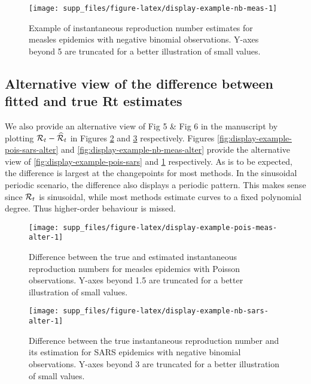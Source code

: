 \documentclass[
]{article}
\begin{document}
\begin{figure}[!ht]

{\centering \texttt{[image: supp\_files/figure-latex/display-example-nb-meas-1]} 

}

\caption{Example of instantaneous reproduction number estimates for measles epidemics with negative binomial observations. Y-axes beyond 5 are truncated for a better illustration of small values.}\label{fig:display-example-nb-meas}
\end{figure}

\clearpage

\subsection{Alternative view of the difference between fitted and true Rt estimates}\label{alternative-view-of-the-difference-between-fitted-and-true-rt-estimates}

We also provide an alternative view of Fig 5 \& Fig 6 in the manuscript by
plotting \(\mathcal{R}_t - \widehat{\mathcal{R}}_t\) in Figures
\ref{fig:display-example-pois-meas-alter} and
\ref{fig:display-example-nb-sars-alter} respectively.
Figures \ref{fig:display-example-pois-sars-alter} and
\ref{fig:display-example-nb-meas-alter} provide the alternative view of
\ref{fig:display-example-pois-sars} and \ref{fig:display-example-nb-meas} respectively.
As is to be expected, the difference is largest at the changepoints for most methods.
In the sinusoidal periodic scenario, the difference also displays a
periodic pattern. This makes sense since \(\mathcal{R}_t\) is
sinusoidal, while most methods estimate curves to a fixed polynomial degree. Thus higher-order
behaviour is missed.

\begin{figure}[!ht]

{\centering \texttt{[image: supp\_files/figure-latex/display-example-pois-meas-alter-1]} 

}

\caption{Difference between the true and estimated instantaneous reproduction numbers for measles epidemics with Poisson observations. Y-axes beyond 1.5 are truncated for a better illustration of small values.}\label{fig:display-example-pois-meas-alter}
\end{figure}

\begin{figure}[!ht]

{\centering \texttt{[image: supp\_files/figure-latex/display-example-nb-sars-alter-1]} 

}

\caption{Difference between the true instantaneous reproduction number and its estimation for SARS epidemics with negative binomial observations. Y-axes beyond 3 are truncated for a better illustration of small values.}\label{fig:display-example-nb-sars-alter}
\end{figure}
\end{document}
